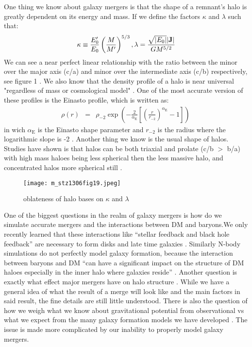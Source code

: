 \documentclass[linenumbers,trackchanges]{aastex7}
\begin{document}
One thing we know about galaxy mergers is that the shape of a remnant’s halo is greatly dependent on its energy and mass. If we define  the factors $\kappa $ and $\lambda$ such that:
\begin{eqnarray*}
\kappa \equiv \frac{E_0^{\prime }}{E_0} \left(\frac{M}{M^{\prime }} \right)^{5/3}, 
\lambda = \frac{\sqrt{|E_0|}|{\bf J}|}{GM^{5/2}} 
\end{eqnarray*}
We can see  a near perfect linear relationship with the ratio between the minor over the major axis (c/a) and minor over the intermediate axis (c/b) respectively, see figure 1 \cite{10.1093/mnras/stz1306}. We also know that the density profile of a halo is near universal "regardless of mass or cosmological model" \cite{10.1093/mnras/stz1307}. One of the most accurate version of these profiles is the Einasto profile, which is written as:
\begin{eqnarray*}
\rho (r) &=& \rho _{-2} \exp \left(-\frac{2}{\alpha _\mathrm{ E}}\left[\left(\frac{r}{r_{-2}}\right)^{\alpha _\mathrm{ E}} - 1 \right]\right) \, 
\end{eqnarray*}
in wich $\alpha _\mathrm{ E}$ is the Einasto shape parameter and ${r_{-2}}$ is the radius where the logarithmic slope is -2 \cite{10.1093/mnras/stz1307}. 
Another thing we know is the usual shape of halos. Studies have shown is that halos can be both triaxial and prolate (c/b $>$ b/a) with high mass haloes being less spherical then the less massive halo, and concentrated halos more spherical still \cite{10.1093/mnras/sty3531}.

\begin{figure}
    \centering
    \texttt{[image: m\_stz1306fig19.jpeg]}
    \caption{oblateness of halo bases on $\kappa $ and  $\lambda $\cite{10.1093/mnras/stz1306}}
    \label{fig:enter-label}
\end{figure}

 One of the biggest questions in the realm of galaxy mergers is how do we simulate accurate mergers and the interactions between DM and baryons.We only recently learned that  these interactions like “stellar feedback and black hole feedback” are necessary to form disks and late time galaxies \cite{10.1093/mnras/stz2873}. Similarly N-body simulations do not perfectly model galaxy formation, because the interaction between baryons and DM “can have a significant impact on the structure of DM haloes especially in the inner halo where galaxies reside” \cite{10.1093/mnras/sty3531}. Another question is exactly what effect major mergers have on halo structure \cite{10.1093/mnras/stz1306}. While we have a general idea of what the result of a merge will look like and the main factors in said result, the fine details are still little understood. There is also the question of how we weigh what we know about gravitational potential from observational vs what we expect from the many galaxy formation models we have developed \cite{10.1093/mnras/stz2873}. The issue is made more complicated by our inability to properly model galaxy mergers.
\end{document}
